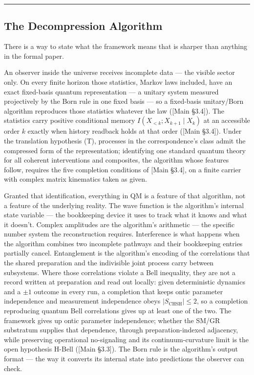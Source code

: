 \documentclass[
]{article}
\begin{document}
\begin{center}\rule{0.5\linewidth}{0.5pt}\end{center}

\hypertarget{the-decompression-algorithm}{%
\subsection{The Decompression
Algorithm}\label{the-decompression-algorithm}}

There is a way to state what the framework means that is sharper than
anything in the formal paper.

An observer inside the universe receives incomplete data --- the visible
sector only. On every finite horizon those statistics, Markov laws
included, have an exact fixed-basis quantum representation --- a unitary
system measured projectively by the Born rule in one fixed basis --- so
a fixed-basis unitary/Born algorithm reproduces those statistics
whatever the law ({[}Main §3.4{]}). The statistics carry positive
conditional memory \(I(X_{<k}; X_{k+1} \mid X_k)\) at an accessible
order \(k\) exactly when history readback holds at that order ({[}Main
§3.4{]}). Under the translation hypothesis (T), processes in the
correspondence's class admit the compressed form of the representation;
identifying one standard quantum theory for all coherent interventions
and composites, the algorithm whose features follow, requires the five
completion conditions of {[}Main §3.4{]}, on a finite carrier with
complex matrix kinematics taken as given.

Granted that identification, everything in QM is a feature of that
algorithm, not a feature of the underlying reality. The wave function is
the algorithm's internal state variable --- the bookkeeping device it
uses to track what it knows and what it doesn't. Complex amplitudes are
the algorithm's arithmetic --- the specific number system the
reconstruction requires. Interference is what happens when the algorithm
combines two incomplete pathways and their bookkeeping entries partially
cancel. Entanglement is the algorithm's encoding of the correlations
that the shared preparation and the indivisible joint process carry
between subsystems. Where those correlations violate a Bell inequality,
they are not a record written at preparation and read out locally: given
deterministic dynamics and a \(\pm1\) outcome in every run, a completion
that keeps ontic parameter independence and measurement independence
obeys \(|S_{\mathrm{CHSH}}|\le2\), so a completion reproducing quantum
Bell correlations gives up at least one of the two. The framework gives
up ontic parameter independence; whether the SM/GR substratum supplies
that dependence, through preparation-indexed adjacency, while preserving
operational no-signaling and its continuum-curvature limit is the open
hypothesis H-Bell ({[}Main §3.3{]}). The Born rule is the algorithm's
output format --- the way it converts its internal state into
predictions the observer can check.
\end{document}

